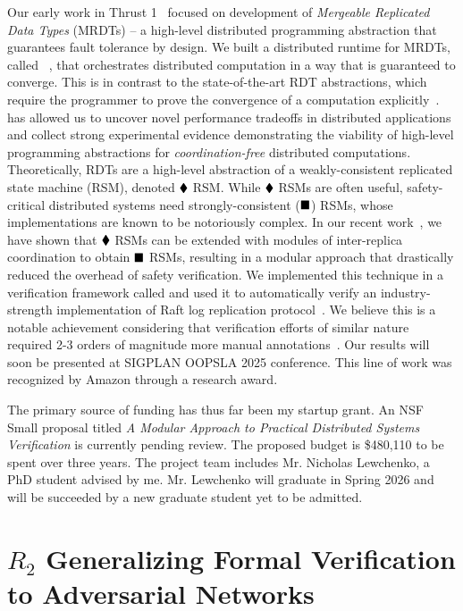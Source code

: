  Our early work in Thrust 1~\cite{mrdt,
snapl19, quark} focused on development of \emph{Mergeable Replicated Data
Types} (MRDTs) -- a high-level distributed programming abstraction that
guarantees fault tolerance by design. We built a distributed runtime for
MRDTs, called \quark~\cite{quark}, that orchestrates distributed
computation in a way that is guaranteed to converge. This is in contrast to
the state-of-the-art RDT abstractions, which require the programmer to
prove the convergence of a computation explicitly~\cite{crdt}. \quark has
allowed us to uncover novel performance tradeoffs in distributed
applications and collect strong experimental evidence demonstrating the
viability of high-level programming abstractions for
\emph{coordination-free} distributed computations. Theoretically, RDTs are
a high-level abstraction of a weakly-consistent replicated state machine
(RSM), denoted $\blacklozenge$ RSM. While $\blacklozenge$ RSMs are often useful,
safety-critical distributed systems need strongly-consistent ($\blacksquare$)
RSMs, whose implementations are known to be notoriously complex. In our
recent work~\cite{lewchenko-oopsla25}, we have shown that $\blacklozenge$ RSMs
can be extended with modules of inter-replica coordination to obtain
$\blacksquare$ RSMs, resulting in a modular approach that drastically reduced
the overhead of safety verification. We implemented this technique in a
verification framework called \superv and used it to automatically verify
an industry-strength implementation of Raft log replication
protocol~\cite{raft}. We believe this is a notable achievement considering
that verification efforts of similar nature required 2-3 orders of
magnitude more manual annotations~\cite{VerdiRaft}. Our results will soon
be presented at SIGPLAN OOPSLA 2025 conference. This line of work was
recognized by Amazon through a research award.

 The primary source of funding has
thus far been my startup grant. An NSF Small proposal titled \emph{A
Modular Approach to Practical Distributed Systems Veriﬁcation} is currently
pending review. The proposed budget is \$480,110 to be spent over three
years. The project team includes Mr. Nicholas Lewchenko, a PhD student
advised by me. Mr. Lewchenko will graduate in Spring 2026 and will be
succeeded by a new graduate student yet to be admitted. 

\section*{$R_2$ Generalizing Formal Verification to Adversarial Networks}

